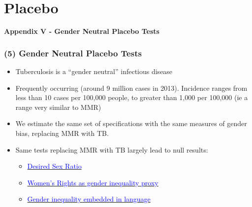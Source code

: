\documentclass[10pt,letterpaper,subeqn]{beamer}
\begin{document}
\section{Placebo}
\begin{frame}[plain]
\begin{center}
\textbf{Appendix V - Gender Neutral Placebo Tests}
\end{center}
\end{frame}


\begin{frame}[label=placebos]
\frametitle{(5) Gender Neutral Placebo Tests}
\begin{itemize}
\setlength{\itemsep}{15pt}
  \item Tuberculosis is a ``gender neutral'' infectious disease
  \item Frequently occurring (around 9 million cases in 2013). Incidence ranges
        from less than 10 cases per 100,000 people, to greater than 1,000 per
        100,000 (ie a range very similar to MMR)
  \item We estimate the same set of specifications with the same measures of
        gender bias, replacing MMR with TB.
  \item Same tests replacing MMR with TB largely lead to null results:
  \begin{itemize}
    \item \hyperlink{placebo2}{\textcolor{blue}{Desired Sex Ratio}}
    \item \hyperlink{placebo1}{\textcolor{blue}{Women's Rights as gender
                                                inequality proxy}}
    \item \hyperlink{placebo3}{\textcolor{blue}{Gender inequality embedded in
                                                language}}
  \end{itemize}
\end{itemize}
\end{frame}
\end{document}
